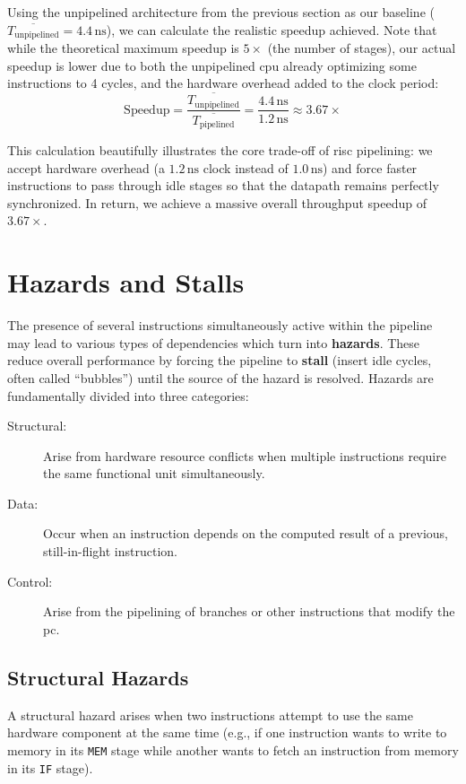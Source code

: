 \noindent Using the unpipelined architecture from the previous section as our baseline (\(\overline{T_{\text{unpipelined}}} = 4.4\,\text{ns}\)), we can calculate the realistic speedup achieved. Note that while the theoretical maximum speedup is \(5\times\) (the number of stages), our actual speedup is lower due to both the unpipelined \gls{cpu} already optimizing some instructions to 4 cycles, and the hardware overhead added to the clock period:
\[
    \text{Speedup} = \frac{\overline{T_{\text{unpipelined}}}}{\overline{T_{\text{pipelined}}}} = \frac{4.4\,\text{ns}}{1.2\,\text{ns}} \approx \mathbf{3.67\times}
\]

\noindent This calculation beautifully illustrates the core trade-off of \gls{risc} pipelining: we accept hardware overhead (a \(1.2\,\text{ns}\) clock instead of \(1.0\,\text{ns}\)) and force faster instructions to pass through idle stages so that the datapath remains perfectly synchronized. In return, we achieve a massive overall throughput speedup of \(3.67\times\).

\section{Hazards and Stalls}
The presence of several instructions simultaneously active within the pipeline may lead to various types of dependencies which turn into \textbf{hazards}. These reduce overall performance by forcing the pipeline to \textbf{stall} (insert idle cycles, often called ``bubbles'') until the source of the hazard is resolved. Hazards are fundamentally divided into three categories:
\begin{description}
    \item[Structural:] Arise from hardware resource conflicts when multiple instructions require the same functional unit simultaneously.
    \item[Data:] Occur when an instruction depends on the computed result of a previous, still-in-flight instruction.
    \item[Control:] Arise from the pipelining of branches or other instructions that modify the \gls{pc}.
\end{description}

\subsection{Structural Hazards}
A structural hazard arises when two instructions attempt to use the same hardware component at the same time (e.g., if one instruction wants to write to memory in its \texttt{MEM} stage while another wants to fetch an instruction from memory in its \texttt{IF} stage). 

